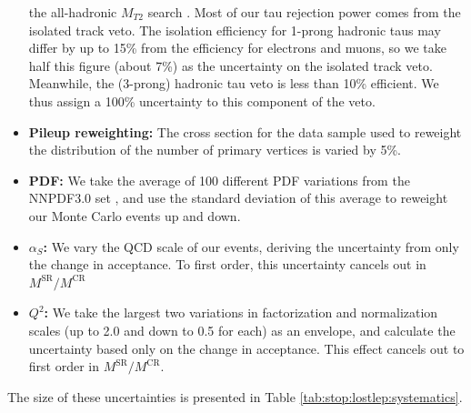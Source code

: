\begin{itemize}
  the all-hadronic $M_{T2}$ search \cite{mt2hadronic}. Most of our tau
  rejection power comes from the isolated track veto. The isolation
  efficiency for 1-prong hadronic taus may differ by up to 15\% from
  the efficiency for electrons and muons, so we take half this figure
  (about 7\%) as the uncertainty on the isolated track
  veto. Meanwhile, the (3-prong) hadronic tau veto is less
  than 10\% efficient. We thus assign a 100\% uncertainty to this
  component of the veto.
\item \textbf{Pileup reweighting:} The cross section for the data
  sample used to reweight the distribution of the number of primary
  vertices is varied by 5\%.
\item \textbf{PDF:} We take the average of 100 different PDF
  variations from the NNPDF3.0 set \cite{nnpdf30}, and use the
  standard deviation of this average to reweight our Monte Carlo events
  up and down.
\item \textbf{$\alpha_S$:} We vary the QCD scale of our events,
  deriving the uncertainty from only the change in acceptance. To
  first order, this uncertainty cancels out in $M^\text{SR} / M^\text{CR}$
\item \textbf{$Q^2$:} We take the largest two variations in
  factorization and normalization scales (up to 2.0 and
  down to 0.5 for each) as an envelope, and calculate
  the uncertainty based only on the change in acceptance. This effect
  cancels out to first order in $M^\text{SR} / M^\text{CR}$.
\end{itemize}
The size of these uncertainties is presented in Table
\ref{tab:stop:lostlep:systematics}.

